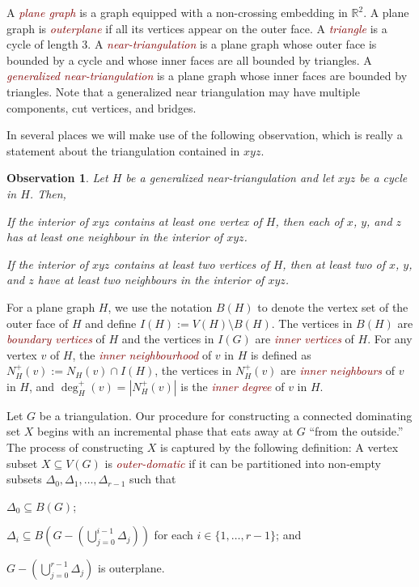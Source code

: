 \documentclass{article}
\newtheorem{obs}{Observation}
\newcommand{\defin}[1]{\emph{\textcolor{Maroon}{#1}}}
\theoremstyle{definition}
\begin{document}
A \defin{plane graph} is a graph equipped with a non-crossing embedding in $\mathbb{R}^2$.  A plane graph is \defin{outerplane} if all its vertices appear on the outer face.  A \defin{triangle} is a cycle of length $3$. A \defin{near-triangulation} is a plane graph whose outer face is bounded by a cycle and whose inner faces are all bounded by triangles.  A \defin{generalized near-triangulation} is a plane graph whose inner faces are bounded by triangles. Note that a generalized near triangulation may have multiple components, cut vertices, and bridges.

In several places we will make use of the following observation, which is really a statement about the triangulation contained in $xyz$.
\begin{obs}\label{useful_little_guy}
  Let $H$ be a generalized near-triangulation and let $xyz$ be a cycle in $H$.  Then,
  \begin{compactenum}
    \item If the interior of $xyz$ contains at least one vertex of $H$, then each of $x$, $y$, and $z$ has at least one neighbour in the interior of $xyz$.

    \item If the interior of $xyz$ contains at least two vertices of $H$, then at least two of $x$, $y$, and $z$ have at least two neighbours in the interior of $xyz$.
  \end{compactenum}
\end{obs}

For a plane graph $H$, we use the notation $B(H)$ to denote the vertex set of the outer face of $H$ and define $I(H):=V(H)\setminus B(H)$.  The vertices in $B(H)$ are \defin{boundary vertices} of $H$ and the vertices in $I(G)$ are \defin{inner vertices} of $H$. For any vertex $v$ of $H$, the \defin{inner neighbourhood} of $v$ in $H$ is defined as $N_H^+(v):=N_H(v)\cap I(H)$, the vertices in $N^+_H(v)$ are \defin{inner neighbours} of $v$ in $H$, and $\deg^+_H(v)=|N^+_H(v)|$ is the \defin{inner degree} of $v$ in $H$.

Let $G$ be a triangulation.  Our procedure for constructing a connected dominating set $X$ begins with an incremental phase that eats away at $G$ ``from the outside.'' The process of constructing $X$ is captured by the following definition:   A vertex subset $X\subseteq V(G)$ is \defin{outer-domatic} if it can be partitioned into non-empty subsets $\Delta_0,\Delta_1,\ldots,\Delta_{r-1}$ such that
\begin{compactenum}[(P1)]
    \item $\Delta_0\subseteq B(G)$; \label{outer_face}
    \item $\Delta_i\subseteq B(G-(\bigcup_{j=0}^{i-1}\Delta_j))$ for each $i\in\{1,\ldots,r-1\}$; and \label{incremental}
    \item $G-(\bigcup_{j=0}^{r-1}\Delta_j)$ is outerplane. \label{outerplanar}
\end{compactenum}
\end{document}
